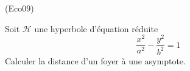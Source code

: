 \begin{tiny}(Eco09)\end{tiny} Soit $\mathcal{H}$ une hyperbole d'équation réduite
\begin{displaymath}
 \frac{x^2}{a^2} - \frac{y^2}{b^2}=1
\end{displaymath}
 Calculer la distance d'un foyer à une asymptote.
